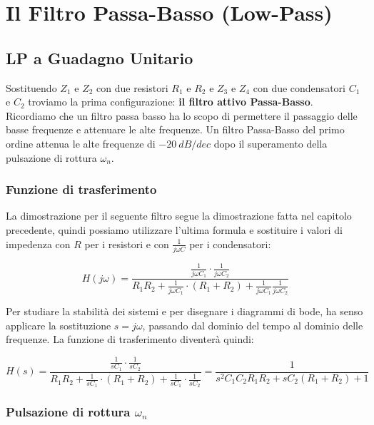 

\chapter{Il Filtro Passa-Basso (Low-Pass)}

\section{LP a Guadagno Unitario}
Sostituendo $Z_1$ e $Z_2$ con due resistori $R_1$ e $R_2$ e $Z_3$ e $Z_4$ con due condensatori $C_1$ e $C_2$ troviamo la prima configurazione: \textbf{il filtro attivo Passa-Basso}.\\
Ricordiamo che un filtro passa basso ha lo scopo di permettere il passaggio delle basse frequenze e attenuare le alte frequenze. Un filtro Passa-Basso del primo ordine attenua le alte frequenze di $\SI{-20}{dB/dec}$ dopo il superamento della pulsazione di rottura $\omega_n$.

\SallenKeyLP

\subsection{Funzione di trasferimento}
La dimostrazione per il seguente filtro segue la dimostrazione fatta nel capitolo precedente, quindi possiamo utilizzare l'ultima formula e sostituire i valori di impedenza con $R$ per i resistori e con $\frac{1}{j\omega C}$ per i condensatori:

\begin{equation}
        H(j\omega) = \frac{\frac{1}{j\omega C_1}\cdot \frac{1}{j\omega C_2}}{R_1R_2+\frac{1}{j\omega C_1}\cdot(R_1+R_2)+\frac{1}{j\omega C_1}\frac{1}{j\omega C_2}}
        \label{eq: FdT jw LP}
\end{equation}

Per studiare la stabilità dei sistemi e per disegnare i diagrammi di bode, ha senso applicare la sostituzione $s = j\omega$, passando dal dominio del tempo al dominio delle frequenze. La funzione di trasferimento diventerà quindi:

\begin{equation}
        H(s) = \frac{\frac{1}{s C_1}\cdot \frac{1}{s C_2}}{R_1R_2+\frac{1}{s C_1}\cdot(R_1+R_2)+\frac{1}{s C_1}\cdot\frac{1}{s C_2}}= \frac{1}{s^2C_1C_2R_1R_2+sC_2(R_1+R_2)+1}
        \label{eq: FdT s LP}
\end{equation}




\subsection{Pulsazione di rottura \texorpdfstring{$\omega_n$}{ωₙ}}

